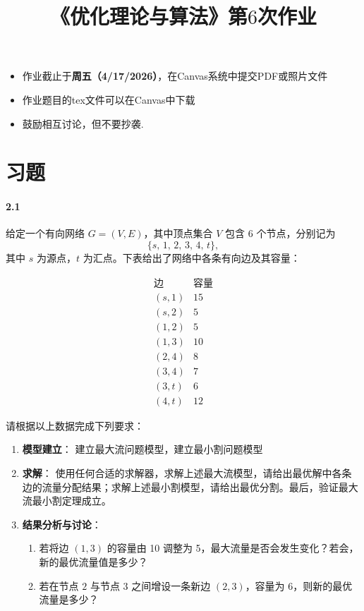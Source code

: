 \documentclass[12pt,a4paper]{article}
\begin{document}
\title{
{《优化理论与算法》第$6$次作业
}
}
\date{}


\maketitle
\begin{itemize}
	\item 作业截止于{\bf 周五（4/17/2026）}，在Canvas系统中提交PDF或照片文件
	\item 作业题目的tex文件可以在Canvas中下载
	\item 鼓励相互讨论，但不要抄袭.
\end{itemize}


\section{习题}


\paragraph{2.1}
给定一个有向网络 $G=(V,E)$，其中顶点集合 $V$ 包含 $6$ 个节点，分别记为
\[
\{s,\,1,\,2,\,3,\,4,\,t\},
\]
其中 $s$ 为源点，$t$ 为汇点。下表给出了网络中各条有向边及其容量：

\[
\begin{array}{c|cc}
\textbf{边} & \textbf{容量} \\ \hline
(s,1) & 15 \\
(s,2) & 5 \\
(1,2) & 5 \\
(1,3) & 10 \\
(2,4) & 8 \\
(3,4) & 7 \\
(3,t) & 6 \\
(4,t) & 12
\end{array}
\]

请根据以上数据完成下列要求：

\begin{enumerate}
  \item \textbf{模型建立}：  
  建立最大流问题模型，建立最小割问题模型

  \item \textbf{求解}：  
  使用任何合适的求解器，求解上述最大流模型，请给出最优解中各条边的流量分配结果；求解上述最小割模型，请给出最优分割。最后，验证最大流最小割定理成立。
  

  \item \textbf{结果分析与讨论}：
  \begin{enumerate}
    \item 若将边 $(1,3)$ 的容量由 10 调整为 5，最大流量是否会发生变化？若会，新的最优流量值是多少？  
    \item 若在节点 $2$ 与节点 $3$ 之间增设一条新边 $(2,3)$，容量为 6，则新的最优流量是多少？  
  \end{enumerate}
\end{enumerate}
\end{document}
